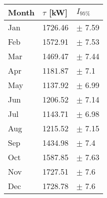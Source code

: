 \begin{tabular}{lll}
\toprule
Month & $\tau$ [kW] &   $I_{95\%}$ \\
\midrule
  Jan &     1726.46 &   $\pm$ 7.59 \\
  Feb &     1572.91 &   $\pm$ 7.53 \\
  Mar &     1469.47 &   $\pm$ 7.44 \\
  Apr &     1181.87 &    $\pm$ 7.1 \\
  May &     1137.92 &   $\pm$ 6.99 \\
  Jun &     1206.52 &   $\pm$ 7.14 \\
  Jul &     1143.71 &   $\pm$ 6.98 \\
  Aug &     1215.52 &   $\pm$ 7.15 \\
  Sep &     1434.98 &    $\pm$ 7.4 \\
  Oct &     1587.85 &   $\pm$ 7.63 \\
  Nov &     1727.51 &    $\pm$ 7.6 \\
  Dec &     1728.78 &    $\pm$ 7.6 \\
\bottomrule
\end{tabular}
